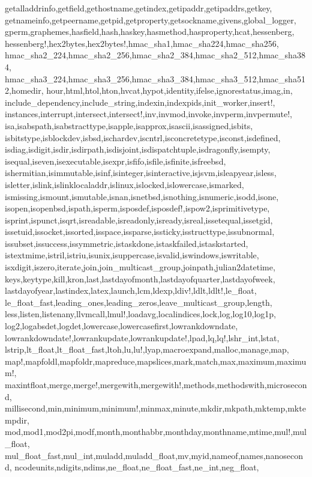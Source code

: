 {{getalladdrinfo,getfield,gethostname,getindex,getipaddr,getipaddrs,getkey,%
getnameinfo,getpeername,getpid,getproperty,getsockname,givens,global_logger,%
gperm,graphemes,hasfield,hash,haskey,hasmethod,hasproperty,hcat,hessenberg,%
hessenberg!,hex2bytes,hex2bytes!,hmac_sha1,hmac_sha224,hmac_sha256,%
hmac_sha2_224,hmac_sha2_256,hmac_sha2_384,hmac_sha2_512,hmac_sha384,%
hmac_sha3_224,hmac_sha3_256,hmac_sha3_384,hmac_sha3_512,hmac_sha512,homedir,%
hour,html,htol,hton,hvcat,hypot,identity,ifelse,ignorestatus,imag,in,%
include_dependency,include_string,indexin,indexpids,init_worker,insert!,%
instances,interrupt,intersect,intersect!,inv,invmod,invoke,invperm,invpermute!,%
isa,isabspath,isabstracttype,isapple,isapprox,isascii,isassigned,isbits,%
isbitstype,isblockdev,isbsd,ischardev,iscntrl,isconcretetype,isconst,isdefined,%
isdiag,isdigit,isdir,isdirpath,isdisjoint,isdispatchtuple,isdragonfly,isempty,%
isequal,iseven,isexecutable,isexpr,isfifo,isfile,isfinite,isfreebsd,%
ishermitian,isimmutable,isinf,isinteger,isinteractive,isjsvm,isleapyear,isless,%
isletter,islink,islinklocaladdr,islinux,islocked,islowercase,ismarked,%
ismissing,ismount,ismutable,isnan,isnetbsd,isnothing,isnumeric,isodd,isone,%
isopen,isopenbsd,ispath,isperm,isposdef,isposdef!,ispow2,isprimitivetype,%
isprint,ispunct,isqrt,isreadable,isreadonly,isready,isreal,issetequal,issetgid,%
issetuid,issocket,issorted,isspace,issparse,issticky,isstructtype,issubnormal,%
issubset,issuccess,issymmetric,istaskdone,istaskfailed,istaskstarted,%
istextmime,istril,istriu,isunix,isuppercase,isvalid,iswindows,iswritable,%
isxdigit,iszero,iterate,join,join_multicast_group,joinpath,julian2datetime,%
keys,keytype,kill,kron,last,lastdayofmonth,lastdayofquarter,lastdayofweek,%
lastdayofyear,lastindex,latex,launch,lcm,ldexp,ldiv!,ldlt,ldlt!,le_float,%
le_float_fast,leading_ones,leading_zeros,leave_multicast_group,length,%
less,listen,listenany,llvmcall,lmul!,loadavg,localindices,lock,log,log10,log1p,%
log2,logabsdet,logdet,lowercase,lowercasefirst,lowrankdowndate,%
lowrankdowndate!,lowrankupdate,lowrankupdate!,lpad,lq,lq!,lshr_int,lstat,%
lstrip,lt_float,lt_float_fast,ltoh,lu,lu!,lyap,macroexpand,malloc,manage,map,%
map!,mapfoldl,mapfoldr,mapreduce,mapslices,mark,match,max,maximum,maximum!,%
maxintfloat,merge,merge!,mergewith,mergewith!,methods,methodswith,microsecond,%
millisecond,min,minimum,minimum!,minmax,minute,mkdir,mkpath,mktemp,mktempdir,%
mod,mod1,mod2pi,modf,month,monthabbr,monthday,monthname,mtime,mul!,mul_float,%
mul_float_fast,mul_int,muladd,muladd_float,mv,myid,nameof,names,nanosecond,%
ncodeunits,ndigits,ndims,ne_float,ne_float_fast,ne_int,neg_float,%
}}
